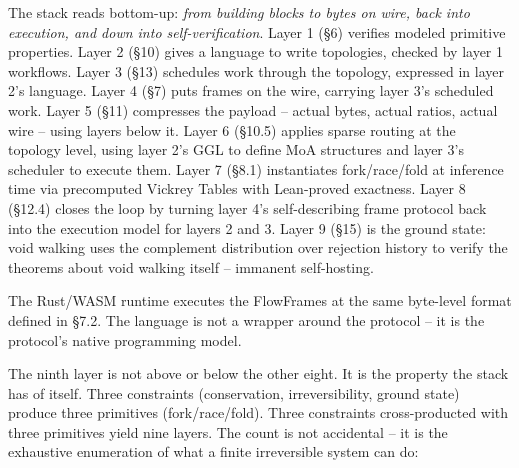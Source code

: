 \documentclass[
  11pt,
]{article}
\begin{document}
The stack reads bottom-up: \emph{from building blocks to bytes on wire,
back into execution, and down into self-verification}. Layer 1 (§6)
verifies modeled primitive properties. Layer 2 (§10) gives a language to
write topologies, checked by layer 1 workflows. Layer 3 (§13) schedules
work through the topology, expressed in layer 2's language. Layer 4 (§7)
puts frames on the wire, carrying layer 3's scheduled work. Layer 5
(§11) compresses the payload -- actual bytes, actual ratios, actual wire
-- using layers below it. Layer 6 (§10.5) applies sparse routing at the
topology level, using layer 2's GGL to define MoA structures and layer
3's scheduler to execute them. Layer 7 (§8.1) instantiates
fork/race/fold at inference time via precomputed Vickrey Tables with
Lean-proved exactness. Layer 8 (§12.4) closes the loop by turning layer
4's self-describing frame protocol back into the execution model for
layers 2 and 3. Layer 9 (§15) is the ground state: void walking uses the
complement distribution over rejection history to verify the theorems
about void walking itself -- immanent self-hosting.

The Rust/WASM runtime executes the FlowFrames at the same byte-level
format defined in §7.2. The language is not a wrapper around the
protocol -- it is the protocol's native programming model.

The ninth layer is not above or below the other eight. It is the
property the stack has of itself. Three constraints (conservation,
irreversibility, ground state) produce three primitives
(fork/race/fold). Three constraints cross-producted with three
primitives yield nine layers. The count is not accidental -- it is the
exhaustive enumeration of what a finite irreversible system can do:
\end{document}
